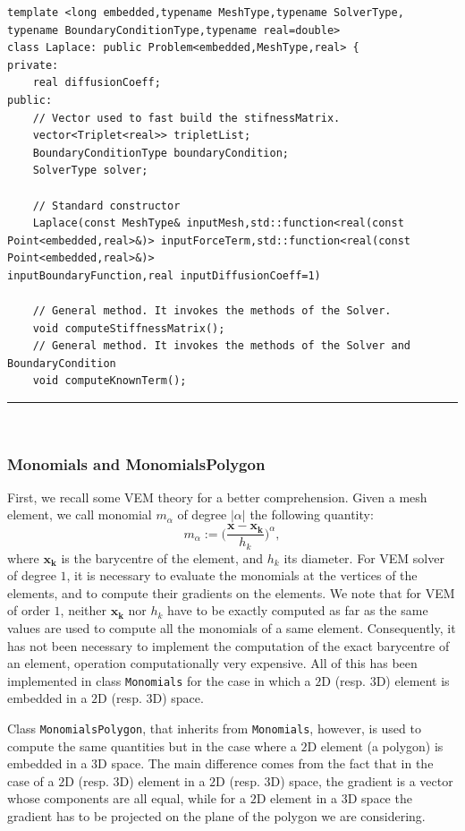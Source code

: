 \begin{verbatim}
template <long embedded,typename MeshType,typename SolverType,
typename BoundaryConditionType,typename real=double>
class Laplace: public Problem<embedded,MeshType,real> {
private:
    real diffusionCoeff;	
public:
    // Vector used to fast build the stifnessMatrix.
    vector<Triplet<real>> tripletList; 
    BoundaryConditionType boundaryCondition;
    SolverType solver;

    // Standard constructor
    Laplace(const MeshType& inputMesh,std::function<real(const 
Point<embedded,real>&)> inputForceTerm,std::function<real(const 
Point<embedded,real>&)> 
inputBoundaryFunction,real inputDiffusionCoeff=1)

    // General method. It invokes the methods of the Solver.
    void computeStiffnessMatrix();
    // General method. It invokes the methods of the Solver and 
BoundaryCondition 
    void computeKnownTerm();
\end{verbatim}
\noindent\rule{12.7cm}{1pt}\\

\subsubsection{Monomials and MonomialsPolygon}
First, we recall some VEM theory for a better comprehension. Given a mesh element, we call monomial $m_\alpha$ of degree $|\alpha|$ the following quantity:
$$
m_\alpha:=\bigg( \frac{\mathbf{x}-\mathbf{x_k}}{h_k} \bigg) ^\alpha,
$$
where $\mathbf{x_k}$ is the barycentre of the element, and $h_k$ its diameter. For VEM solver of degree $1$, it is necessary to evaluate the monomials at the vertices of the elements, and to compute their gradients on the elements. 
We note that for VEM of order $1$, neither $\mathbf{x_k}$ nor $h_k$ have to be exactly computed as far as the same values are used to compute all the monomials of a same element. Consequently, it has not been necessary to implement the computation of the exact barycentre of an element, operation computationally very expensive. 
All of this has been implemented in class \verb|Monomials| for the case in which a $2$D (resp. $3$D) element is embedded in a $2$D (resp. $3$D) space.

Class \verb|MonomialsPolygon|, that inherits from  \verb|Monomials|, however, is used to compute the same quantities but in the case where a $2$D element (a polygon) is embedded in a $3$D space. The main difference comes from the fact that in the case of a $2$D (resp. $3$D) element in a $2$D (resp. $3$D) space, the gradient is a vector whose components are all equal, while for a $2$D element in a $3$D space the gradient has to be projected on the plane of the polygon we are considering.\\

